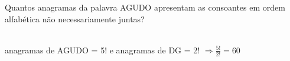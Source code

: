 \begin{ex}
Quantos anagramas da palavra AGUDO apresentam as consoantes em ordem alfabética não necessariamente juntas?
  \begin{sol}
    \phantom{A} \\
    anagramas de AGUDO = 5! e anagramas de DG = 2!
    $\Longrightarrow \frac{5!}{2!}=60$
  \end{sol}
\end{ex}